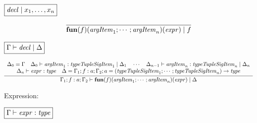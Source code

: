 $\fbox{$\mathit{decl} \mid x_1, \ldots, x_n$}$

\begin{gather*}
  \infer{\mathbf{fun}(f)(\mathit{argItem}_1; \cdots; \mathit{argItem}_n)(\mathit{expr}) \mid f}{}
\end{gather*}

$\fbox{$\Gamma \vdash \mathit{decl} \mid \Delta$}$

\begin{gather*}
  \infer{\Gamma_1; f: a; \Gamma_2 \vdash \mathbf{fun}(f)(\mathit{argItem}_1; \cdots; \mathit{argItem}_n)(\mathit{expr}) \mid \Delta}{
    \begin{array}{c}
      \Delta_0 = \Gamma
      \hspace{1em}
      \Delta_0 \vdash \mathit{argItem}_1: \mathit{typeTupleSigItem}_1 \mid \Delta_1
      \hspace{1em}
      \cdots
      \hspace{1em}
      \Delta_{n - 1} \vdash \mathit{argItem}_n: \mathit{typeTupleSigItem}_n \mid \Delta_n
      \\
      \Delta_n \vdash \mathit{expr}: \mathit{type}
      \hspace{1em}
      \Delta = \Gamma_1; f: a; \Gamma_2; a = (\mathit{typeTupleSigItem}_1; \cdots; \mathit{typeTupleSigItem}_n) \rightarrow \mathit{type}
    \end{array}
  }
\end{gather*}

Expression:

$\fbox{$\Gamma \vdash \mathit{expr}: \mathit{type}$}$

